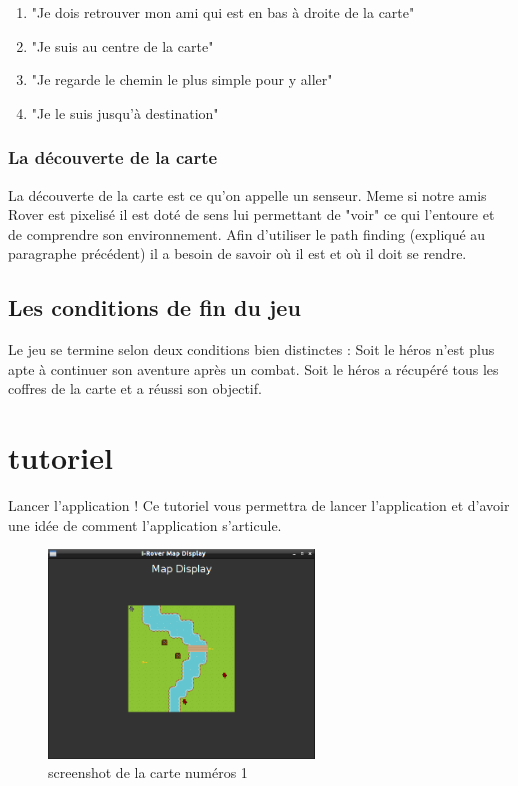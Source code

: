 \documentclass[a4paper 12pts]{article}
\begin{document}
\begin{enumerate}
\item "Je dois retrouver mon ami qui est en bas à droite de la carte"
\item "Je suis au centre de la carte"
\item "Je regarde le chemin le plus simple pour y aller"
\item "Je le suis jusqu'à destination"
\end{enumerate}

\vspace{0.75cm}

\subsubsection{La découverte de la carte}

\vspace{0.75cm}

La découverte de la carte est ce qu'on appelle un senseur.
Meme si notre amis Rover est pixelisé il est doté de sens lui permettant de "voir" ce qui l'entoure et de comprendre son environnement.
Afin d'utiliser le path finding (expliqué au paragraphe précédent) il a besoin de savoir où il est et où il doit se rendre.

\vspace{0.75cm}

\subsection{Les conditions de fin du jeu}

\vspace{0.75cm}

Le jeu se termine selon deux conditions bien distinctes :
Soit le héros n'est plus apte à continuer son aventure après un combat.
Soit le héros a récupéré tous les coffres de la carte et a réussi son objectif.

\newpage

\section{tutoriel}
\vspace{0.55cm}

Lancer l'application !
Ce tutoriel vous permettra de lancer l'application et d'avoir une idée de comment l'application s'articule.

\vspace{0.25cm}
\begin{figure}[h]
   \includegraphics[width=200pt]{Illustration/screens/screen1.png}
	\caption{screenshot de la carte numéros 1}
\end{figure}
\end{document}
